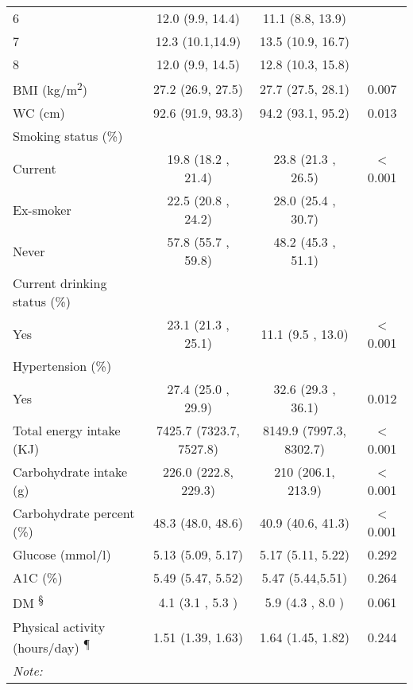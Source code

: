 \begin{table}
\begin{tabular}[t]{lccc}
			\hspace{1em}6 & 12.0 (9.9, 14.4) & 11.1 (8.8, 13.9) & \\
			\hspace{1em}7 & 12.3 (10.1,14.9) & 13.5 (10.9, 16.7) & \\
			\hspace{1em}8 & 12.0 (9.9, 14.5) & 12.8 (10.3, 15.8) & \\
			BMI (kg/m\textsuperscript{2}) & 27.2 (26.9, 27.5) & 27.7 (27.5, 28.1) & 0.007\\
			WC (cm) & 92.6 (91.9, 93.3) & 94.2 (93.1, 95.2) & 0.013\\
			Smoking status (\%) &  &  & \\
			\hspace{1em}Current & 19.8  (18.2 , 21.4) & 23.8 (21.3 , 26.5) & < 0.001\\
			\hspace{1em}Ex-smoker & 22.5  (20.8 , 24.2) & 28.0 (25.4 , 30.7) & \\
			\hspace{1em}Never & 57.8  (55.7 , 59.8) & 48.2 (45.3 , 51.1) & \\
			Current drinking status (\%) &  &  & \\
			\hspace{1em}Yes & 23.1  (21.3 , 25.1) & 11.1  (9.5 , 13.0) & < 0.001\\
			Hypertension (\%) \textsuperscript{\dag} &  &  & \\
			\hspace{1em}Yes & 27.4  (25.0 , 29.9) & 32.6  (29.3 , 36.1) & 0.012\\
			Total energy intake (KJ) & 7425.7 (7323.7, 7527.8) & 8149.9 (7997.3, 8302.7) & < 0.001\\
			Carbohydrate intake (g) & 226.0 (222.8, 229.3) & 210 (206.1, 213.9) & < 0.001\\
			Carbohydrate
			percent (\%) \textsuperscript{\ddag} & 48.3 (48.0, 48.6) & 40.9 (40.6, 41.3) & < 0.001\\
			Glucose (mmol/l) & 5.13 (5.09, 5.17) & 5.17 (5.11, 5.22) & 0.292\\
			A1C (\%) & 5.49 (5.47, 5.52) & 5.47 (5.44,5.51) & 0.264\\
			DM \textsuperscript{\S} & 4.1  (3.1 , 5.3 ) & 5.9  (4.3 , 8.0 ) & 0.061\\
			Physical
			activity (hours/day) \textsuperscript{\P} & 1.51 (1.39, 1.63) & 1.64 (1.45, 1.82) & 0.244\\
			\bottomrule
			\multicolumn{4}{l}{\textit{Note: }}\\

\end{tabular}
\end{table}
